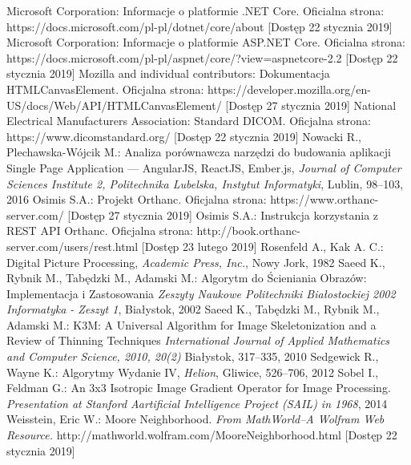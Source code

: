 \documentclass[a4paper,11pt,twoside,openright]{report}
\theoremstyle{definition}
\begin{document}
\begin{thebibliography}{24}
 Microsoft Corporation: Informacje o platformie .NET Core. Oficialna strona: https://docs.microsoft.com/pl-pl/dotnet/core/about [Dostęp 22 stycznia 2019]
 Microsoft Corporation: Informacje o platformie ASP.NET Core. Oficialna strona: https://docs.microsoft.com/pl-pl/aspnet/core/?view=aspnetcore-2.2 [Dostęp 22 stycznia 2019]
 Mozilla and individual contributors: Dokumentacja HTMLCanvasElement. Oficjalna strona: https://developer.mozilla.org/en-US/docs/Web/API/HTMLCanvasElement/ [Dostęp 27 stycznia 2019]
 National Electrical Manufacturers Association: Standard DICOM. Oficjalna strona: https://www.dicomstandard.org/ [Dostęp 22 stycznia 2019]
 Nowacki R., Plechawska-Wójcik M.: Analiza porównawcza narzędzi do budowania aplikacji Single Page Application --- AngularJS, ReactJS, Ember.js, \emph{Journal of Computer Sciences Institute 2, Politechnika Lubelska, Instytut Informatyki}, Lublin, 98--103, 2016
 Osimis S.A.: Projekt Orthanc. Oficjalna strona: https://www.orthanc-server.com/ [Dostęp 27 stycznia 2019]
 Osimis S.A.: Instrukcja korzystania z REST API Orthanc. Oficjalna strona: http://book.orthanc-server.com/users/rest.html [Dostęp 23 lutego 2019]
 Rosenfeld A., Kak A. C.: Digital Picture Processing, \emph{Academic Press, Inc.}, Nowy Jork, 1982
 Saeed K., Rybnik M., Tabędzki M., Adamski M.: Algorytm do Ścieniania Obrazów: Implementacja i Zastosowania \emph{Zeszyty Naukowe Politechniki Białostockiej 2002 Informatyka - Zeszyt 1}, Białystok, 2002
 Saeed K., Tabędzki M., Rybnik M., Adamski M.: K3M: A Universal Algorithm for Image Skeletonization and a Review of Thinning Techniques \emph{International Journal of Applied Mathematics and Computer Science, 2010, 20(2)} Białystok, 317--335, 2010
 Sedgewick R., Wayne K.: Algorytmy Wydanie IV, \emph{Helion}, Gliwice, 526--706, 2012
 Sobel I., Feldman G.: An 3x3 Isotropic Image Gradient Operator for Image Processing. \emph {Presentation at Stanford Aartificial Intelligence Project (SAIL) in 1968}, 2014
  Weisstein, Eric W.: Moore Neighborhood. \emph{From MathWorld--A Wolfram Web Resource.} http://mathworld.wolfram.com/MooreNeighborhood.html  [Dostęp 22 stycznia 2019]

\end{thebibliography}
\end{document}
